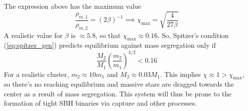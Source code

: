 The expression above has the maximum value
\begin{equation*}
    \frac{\rho_{m,1}}{\rho_{m,2}} = (2\beta)^{-1} \implies \chi_{\text{max}} = \sqrt{\frac{4}{27\beta}}
\end{equation*}
A realistic value for $\beta$ is $\approx 5.8$, so that $\chi_{\text{max}}\approx 0.16$. So, Spitzer's condition (\ref{eq:spitzer_gen}) predicts equilibrium against mass segregation only if 
\begin{equation}
    \frac{M_{2}}{M_{1}}\left(\frac{m_{2}}{m_{1}}\right)^{3/2} < 0.16
    \label{eq:spitzer_cond}
\end{equation}
For a realistic cluster, $m_{2}\approx 10m_{1}$ and $M_{2}\approx 0.03M_{1}$. This implies $\chi \approx 1 > \chi_{\text{max}}$, so there's no reaching equilibrium and massive stars are dragged towards the center as a result of mass segregation. This system will thus be prone to the formation of tight SBH binaries via capture and other processes.
